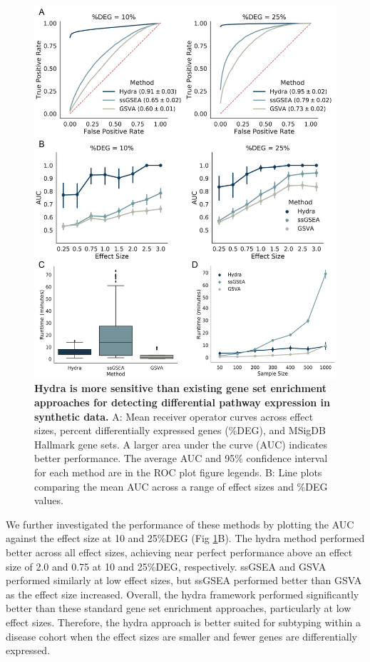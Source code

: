 \documentclass[10pt,letterpaper]{article}
\begin{document}
\begin{figure}[!h]
	\includegraphics[width=\textwidth]{img/PNG/ROC-PLOT-V2-2x}
	\caption{{\bf Hydra is more sensitive than existing gene set enrichment approaches for detecting differential pathway expression in synthetic data.}
		A: Mean receiver operator curves across effect sizes, percent differentially expressed genes (\%DEG), and MSigDB Hallmark gene sets. A larger area under the curve (AUC) indicates better performance. The average AUC and 95\% confidence interval for each method are in the ROC plot figure legends. B: Line plots comparing the mean AUC across a range of effect sizes and \%DEG values.
		\label{rocplot}}
\end{figure}

We further investigated the performance of these methods by plotting the AUC against the effect size at 10 and 25\%DEG (Fig \ref{rocplot}B). The hydra method performed better across all effect sizes, achieving near perfect performance above an effect size of 2.0 and 0.75 at 10 and 25\%DEG, respectively. ssGSEA and GSVA performed similarly at low effect sizes, but ssGSEA performed better than GSVA as the effect size increased. Overall, the hydra framework performed significantly better than these standard gene set enrichment approaches, particularly at low effect sizes. Therefore, the hydra approach is better suited for subtyping within a disease cohort when the effect sizes are smaller and fewer genes are differentially expressed.
\end{document}
